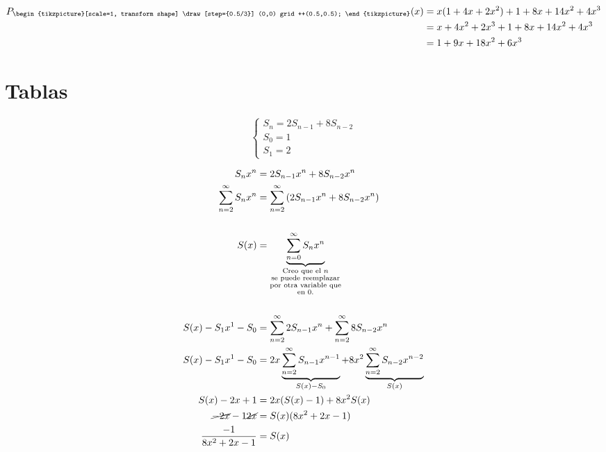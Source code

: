 \documentclass[../main.tex]{subfiles}
\begin{document}
\begin{align*}
	P_
	{
		\begin{tikzpicture}[scale=1, transform shape]
			\draw[step={0.5/3}] (0,0) grid ++(0.5,0.5);
		\end{tikzpicture}
	}(x)
	&= x(1+4x+2x^2)+1+8x+14x^2+4x^3\\
	&= x+4x^2+2x^3+1+8x+14x^2+4x^3\\
	&= 1+9x+18x^2+6x^3
\end{align*}

\section{Tablas}%
\label{sec:tablas}
\[
	\begin{cases}
		S_n = 2S_{n-1}+8S_{n-2}\\
		S_0 = 1\\
		S_1 = 2
	\end{cases}
\]

\begin{align*}
	S_nx^n&=2S_{n-1}x^n+8S_{n-2}x^n\\
	\sum_{n=2}^\infty
	S_nx^n &=
	\sum_{n=2}^\infty
	\left(
		2S_{n-1}x^n+8S_{n-2}x^n
	\right)\\
	\\
	S(x) &=
	\underbrace
	{
		\sum_{n=0}^\infty
		S_nx^n
	}_
	{
		\substack
		{
			\text{Creo que el $n$}\\
			\text{se puede reemplazar}\\
			\text{por otra variable que}\\
			\text{en $0$.}
		}
	}\\
	\\
	S(x)-S_1x^1-S_0&=
	\sum_{n=2}^\infty
	2S_{n-1}x^n
	+
	\sum_{n=2}^\infty
	8S_{n-2}x^n\\
	S(x)-S_1x^1-S_0&=
	2x
	\underbrace
	{
		\sum_{n=2}^\infty
		S_{n-1}x^{n-1}
	}_
	{
		S(x)-S_0
	}
	+
	8x^2
	\underbrace
	{
		\sum_{n=2}^\infty
		S_{n-2}x^{n-2}
	}_
	{
		S(x)
	}\\
	S(x)-2x+1 &=
	2x(S(x)-1)+8x^2S(x)\\
	\cancel{-2x}
	-1
	\cancel{2x} &=
	S(x)(8x^2+2x-1)\\
	\frac{-1}{8x^2+2x-1} &= S(x)
\end{align*}
\end{document}
